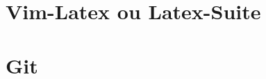 \documentclass[12pt,a4paper,openright,twoside]{book}
\begin{document}














\part{Vim-Latex ou Latex-Suite}




\part{Git}







\backmatter 



\end{document}
